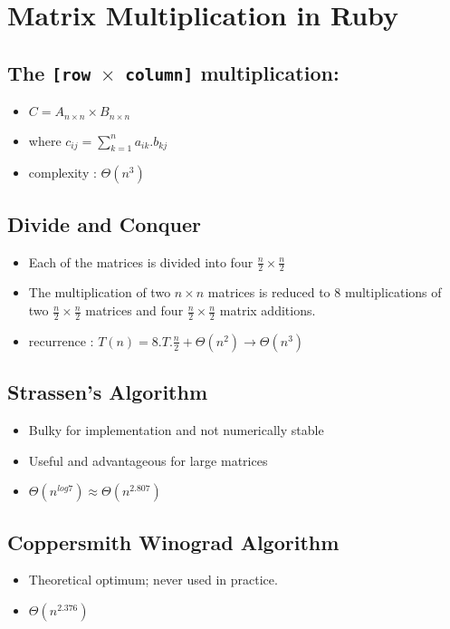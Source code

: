 \documentclass[11pt, letterpaper, oneside]{article}
\begin{document}
\section{Matrix Multiplication in Ruby}


\subsection{The \texttt{[row $\times$ column]} multiplication:}
\begin{itemize}
\item $ C = A_{n \times n} \times B_{n \times n}$
\item where $ c_{ij} = \sum\limits_{k=1}^n a_{ik} . b_{kj}   $
\item complexity : $\Theta(n^3)$ \\
\end{itemize}


\subsection{Divide and Conquer}

\begin{itemize}

\item Each of the matrices is divided into four $\frac{n}{2} \times \frac{n}{2}$
\item The multiplication of two $ n \times  n $ matrices is reduced to 8 multiplications of
two $\frac{n}{2} \times \frac{n}{2}$ matrices and four $\frac{n}{2} \times \frac{n}{2}$ matrix additions.
\item recurrence : $T(n) = 8.T. \frac{n}{2} + \Theta(n^2) \rightarrow \Theta(n^3)$ \\
\end{itemize}

\subsection{Strassen's Algorithm}

\begin{itemize}

\item Bulky for implementation and not numerically stable
\item Useful and advantageous for large matrices
\item $ \Theta(n^{log7}) \approx \Theta(n^{2.807})$ \\
\end{itemize}

\subsection{Coppersmith Winograd Algorithm}

\begin{itemize}

\item Theoretical optimum; never used in practice.
\item $ \Theta(n^{2.376}) $ \\
\end{itemize}
\end{document}
